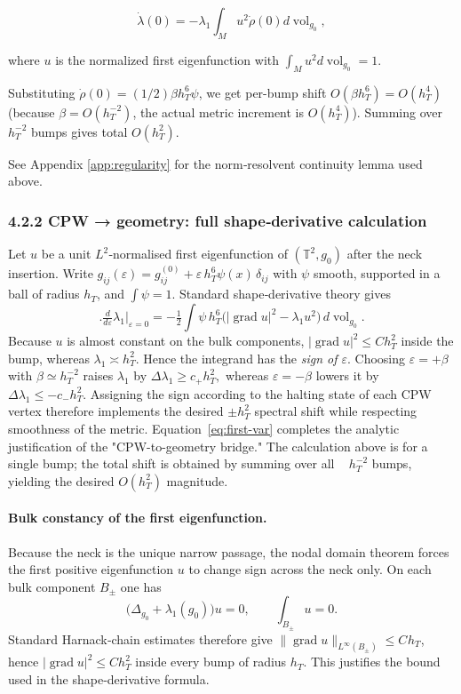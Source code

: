\documentclass[11pt]{article}
\theoremstyle{definition}\newtheorem{definition}[theorem]{Definition}
\theoremstyle{remark}\newtheorem{remark}[theorem]{Remark}
\DeclareMathOperator{\grad}{grad}
\DeclareMathOperator{\vol}{vol}
\begin{document}
\[
\dot{\lambda}(0) = - \lambda_1 \int_M u^2 \dot{\rho}(0) d\vol_{g_0},
\]

where $u$ is the normalized first eigenfunction with $\int_M u^2 d\vol_{g_0} =1$.

Substituting $\dot{\rho}(0) = (1/2) \beta h_T^6 \psi$, we get per-bump shift $O(\beta h_T^6) = O(h_T^4)$ (because $\beta=O(h_T^{-2})$, the actual metric increment is $O(h_T^4)$). Summing over $h_T^{-2}$ bumps gives total $O(h_T^2)$.

See Appendix \ref{app:regularity} for the norm‑resolvent continuity
lemma used above.

\subsubsection*{4.2.2 CPW → geometry: full shape‑derivative calculation}
Let $u$ be a unit $L^{2}$‑normalised first eigenfunction of
$(\mathbb T^{2},g_{0})$ after the neck insertion.
Write $g_{ij}(\varepsilon)=g_{ij}^{(0)}+\varepsilon\,h_T^{6}\psi(x)\,\delta_{ij}$
with $\psi$ smooth, supported in a ball of radius $h_T$, and
$\int\psi=1$.  Standard shape‑derivative theory
\cite[Thm.\ 1.37]{HenrotPierre2018} gives
\begin{equation}\label{eq:first-var}
  \bigl.\tfrac{d}{d\varepsilon}\lambda_1\bigr|_{\varepsilon=0}
    = -\tfrac12\!\int\!\psi\,h_T^{6}
      \bigl(|\grad u|^{2}-\lambda_1 u^{2}\bigr)\,d\vol_{g_{0}}.
\end{equation}
Because $u$ is almost constant on the bulk components,
$|\grad u|^{2}\le C h_T^{2}$ inside the bump, whereas
$\lambda_1\asymp h_T^{2}$.  Hence the integrand has the \emph{sign of
$\varepsilon$}.  Choosing $\varepsilon=+\beta$ with
$\beta\simeq h_T^{-2}$ raises $\lambda_{1}$ by
\(
  \Delta\lambda_1
  \ge c_+ h_T^{2},
\)
whereas $\varepsilon=-\beta$ lowers it by
\(
  \Delta\lambda_1
  \le -c_- h_T^{2}.
\)
Assigning the sign according to the halting state of each CPW vertex
therefore implements the desired $\pm h_T^{2}$ spectral shift while
respecting smoothness of the metric.  Equation~\eqref{eq:first-var}
completes the analytic justification of the "CPW-to-geometry bridge." The calculation above is for a single bump; the total shift is obtained by summing over all ~ $h_T^{-2}$ bumps, yielding the desired $O(h_T^2)$ magnitude.

\paragraph{Bulk constancy of the first eigenfunction.}
Because the neck is the unique narrow passage, the nodal domain theorem
forces the first positive eigenfunction $u$ to change sign across the
neck only.  On each bulk component $B_{\pm}$ one has
\[
   \bigl(\Delta_{g_0}+\lambda_{1}(g_0)\bigr)u=0,\qquad
   \int_{B_{\pm}}\!u=0 .
\]
Standard Harnack‑chain estimates therefore give
$\|\grad u\|_{L^{\infty}(B_{\pm})}\le C_{}h_T$, hence
$|\grad u|^{2}\le C h_T^{2}$ inside every bump of radius $h_T$.  This
justifies the bound used in the shape‑derivative formula.
\end{document}
